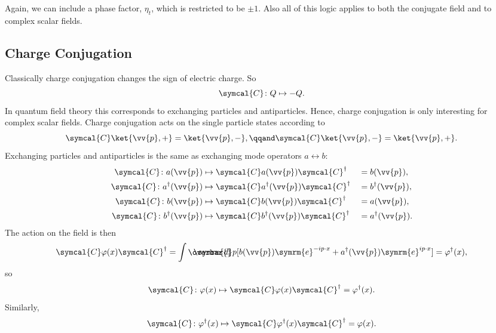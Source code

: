 \documentclass[fleqn]{NotesClass}
\newcommand{\e}{\symrm{e}}
\newcommand{\chargeConjugation}{\symcal{C}}
\newcommand{\hermit}{{\dagger}}
\newcommand\dbar{\ThisStyle{\ensurestackMath{%
            \stackengine{-.3\LMpt}{\SavedStyle \symrm{d}}{\SavedStyle\overbar{}%
                \mkern2.25mu}{O}{r}{F}{F}{L}}}}
\newcommand{\invariantmeasure}[1]{\dbar #1}
\begin{document}
    Again, we can include a phase factor, \(\eta_t\), which is restricted to be \(\pm 1\).
    Also all of this logic applies to both the conjugate field and to complex scalar fields.
    
    \subsection{Charge Conjugation}
    Classically charge conjugation changes the sign of electric charge.
    So
    \begin{equation}
        \chargeConjugation \colon Q \mapsto -Q.
    \end{equation}
    In quantum field theory this corresponds to exchanging particles and antiparticles.
    Hence, charge conjugation is only interesting for complex scalar fields.
    Charge conjugation acts on the single particle states according to
    \begin{equation}
        \chargeConjugation \ket{\vv{p}, +} = \ket{\vv{p}, -}, \qqand \chargeConjugation \ket{\vv{p}, -} = \ket{\vv{p}, +}.
    \end{equation}
    Exchanging particles and antiparticles is the same as exchanging mode operators \(a \leftrightarrow b\):
    \begin{alignat}{2}
        \chargeConjugation \colon a(\vv{p}) &\mapsto \chargeConjugation a(\vv{p}) \chargeConjugation^\hermit &&= b(\vv{p}),\\
        \chargeConjugation \colon a^\hermit(\vv{p}) &\mapsto \chargeConjugation a^\hermit(\vv{p}) \chargeConjugation^\hermit &&= b^\hermit(\vv{p}),\\
        \chargeConjugation \colon b(\vv{p}) &\mapsto \chargeConjugation b(\vv{p}) \chargeConjugation^\hermit &&= a(\vv{p}),\\
        \chargeConjugation \colon b^\hermit(\vv{p}) &\mapsto \chargeConjugation b^\hermit(\vv{p}) \chargeConjugation^\hermit &&= a^\hermit(\vv{p}).
    \end{alignat}
    The action on the field is then
    \begin{align}
        \chargeConjugation \varphi(x) \chargeConjugation^\hermit = \int \invariantmeasure{p} [b(\vv{p})\e^{-ip\cdot x} + a^\hermit(\vv{p})\e^{ip\cdot x}] = \varphi^\hermit(x),
    \end{align}
    so
    \begin{equation}
        \chargeConjugation\colon \varphi(x) \mapsto \chargeConjugation \varphi(x) \chargeConjugation^\hermit = \varphi^\hermit(x).
    \end{equation}
    Similarly,
    \begin{equation}
        \chargeConjugation\colon \varphi^\hermit(x) \mapsto \chargeConjugation \varphi^\hermit(x) \chargeConjugation^\hermit = \varphi(x).
    \end{equation}
    
\end{document}

